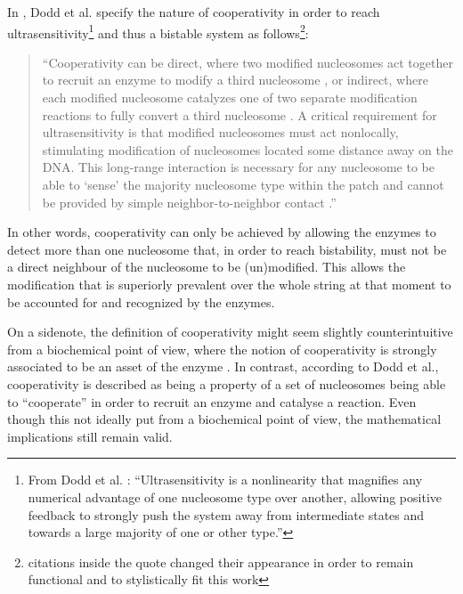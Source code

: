             In \cite{dodd2011barriers}, Dodd et al. specify the nature of cooperativity in order to reach ultrasensitivity\footnote{From Dodd et al. \cite{dodd2011barriers}: \enquote{Ultrasensitivity is a nonlinearity that magnifies any numerical advantage of one nucleosome type over another, allowing positive feedback to strongly push the system away from intermediate states and towards a large majority of one or other type.}} and thus a bistable system as follows\footnote{citations inside the quote changed their appearance in order to remain functional and to stylistically fit this work}:

            \begin{quote}
                “Cooperativity can be direct, where two modified nucleosomes act together to recruit an enzyme to modify a third nucleosome \cite{3dodd2007theoretical,11sedighi2007epigenetic,15micheelsen2010theory}, or indirect, where each modified nucleosome catalyzes one of two separate modification reactions to fully convert a third nucleosome \cite{3dodd2007theoretical,13david2009inheritance}. A critical requirement for ultrasensitivity is that modified nucleosomes must act nonlocally, stimulating modification of nucleosomes located some distance away on the DNA. This long-range interaction is necessary for any nucleosome to be able to ‘sense’ the majority nucleosome type within the patch and cannot be provided by simple neighbor-to-neighbor contact \cite{3dodd2007theoretical,15micheelsen2010theory}.”
            \end{quote}

            In other words, cooperativity can only be achieved by allowing the enzymes to detect more than one nucleosome that, in order to reach bistability, must not be a direct neighbour of the nucleosome to be (un)modified. This allows the modification that is superiorly prevalent over the whole string at that moment to be accounted for and recognized by the enzymes.

            On a sidenote, the definition of cooperativity might seem slightly counterintuitive from a biochemical point of view, where the notion of cooperativity is strongly associated to be an asset of the enzyme \cite{cooperativityDefBritannica}. In contrast, according to Dodd et al., cooperativity is described as being a property of a set of nucleosomes being able to “cooperate” in order to recruit an enzyme and catalyse a reaction. Even though this not ideally put from a biochemical point of view, the mathematical implications still remain valid. %

